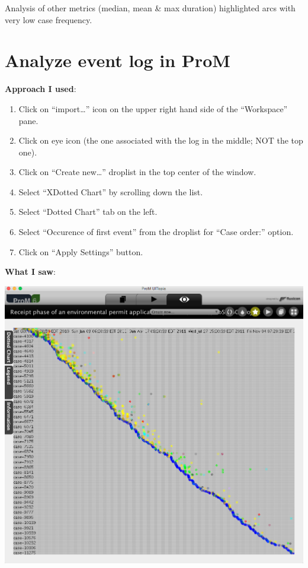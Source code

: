 \documentclass[]{article}
\begin{document}
Analysis of other metrics (median, mean \& max duration) highlighted
arcs with very low case frequency.

\section{Analyze event log in ProM}\label{analyze-event-log-in-prom}

\textbf{Approach I used}:

\begin{enumerate}
\def\labelenumi{\arabic{enumi}.}
\itemsep1pt\parskip0pt
\item
  Click on ``import\ldots{}'' icon on the upper right hand side of the
  ``Workspace'' pane.
\item
  Click on eye icon (the one associated with the log in the middle; NOT
  the top one).
\item
  Click on ``Create new\ldots{}'' droplist in the top center of the
  window.
\item
  Select ``XDotted Chart'' by scrolling down the list.
\item
  Select ``Dotted Chart'' tab on the left.
\item
  Select ``Occurence of first event'' from the droplist for ``Case
  order:'' option.
\item
  Click on ``Apply Settings'' button.
\end{enumerate}

\textbf{What I saw}:

\includegraphics{CoSeLoG_Step_04.png}
\end{document}
